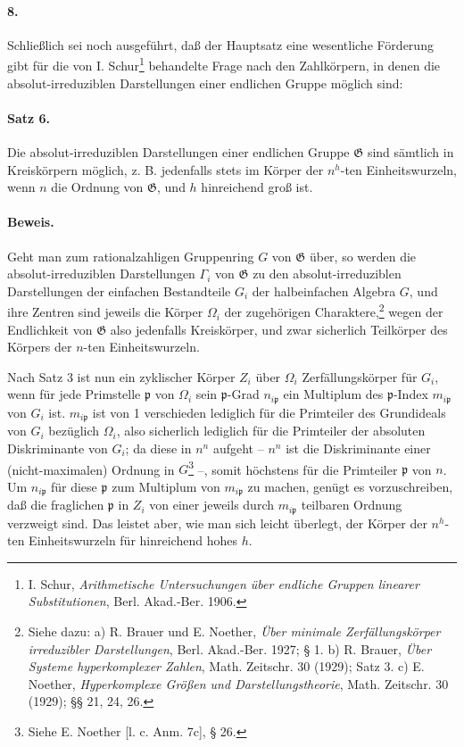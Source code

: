 \paragraph{8.}
Schließlich sei noch ausgeführt, daß der Hauptsatz eine wesentliche Förderung gibt für die von I. Schur\footnote{I. Schur, \emph{Arithmetische Untersuchungen über endliche Gruppen linearer Substitutionen}, Berl. Akad.-Ber. 1906.} behandelte Frage nach den Zahlkörpern, in denen die absolut-irreduziblen Darstellungen einer endlichen Gruppe möglich sind:

\paragraph{Satz 6.}
Die absolut-irreduziblen Darstellungen einer endlichen Gruppe \(\mathfrak G\) sind sämtlich in Kreiskörpern möglich, z. B. jedenfalls stets im Körper der \(n^h\)-ten Einheitswurzeln, wenn \(n\) die Ordnung von \(\mathfrak G\), und \(h\) hinreichend groß ist.

\paragraph{Beweis.}
Geht man zum rationalzahligen Gruppenring \(G\) von \(\mathfrak G\) über, so werden die absolut-irreduziblen Darstellungen \(\Gamma_i\) von \(\mathfrak G\) zu den absolut-irreduziblen Darstellungen der einfachen Bestandteile \(G_i\) der halbeinfachen Algebra \(G\), und ihre Zentren sind jeweils die Körper \(\Omega_i\) der zugehörigen Charaktere,\footnote{Siehe dazu: a) R. Brauer und E. Noether, \emph{Über minimale Zerfällungskörper irreduzibler Darstellungen}, Berl. Akad.-Ber. 1927; § 1. b) R. Brauer, \emph{Über Systeme hyperkomplexer Zahlen}, Math. Zeitschr. 30 (1929); Satz 3. c) E. Noether, \emph{Hyperkomplexe Größen und Darstellungstheorie}, Math. Zeitschr. 30 (1929); §§ 21, 24, 26.} wegen der Endlichkeit von \(\mathfrak G\) also jedenfalls Kreiskörper, und zwar sicherlich Teilkörper des Körpers der \(n\)-ten Einheitswurzeln.

Nach Satz 3 ist nun ein zyklischer Körper \(Z_i\) über \(\Omega_i\) Zerfällungskörper für \(G_i\), wenn für jede Primstelle \(\mathfrak p\) von \(\Omega_i\) sein \(\mathfrak p\)-Grad \(n_{i\mathfrak p}\) ein Multiplum des \(\mathfrak p\)-Index \(m_{i\mathfrak p}\) von \(G_i\) ist. \(m_{i\mathfrak p}\) ist von 1 verschieden lediglich für die Primteiler des Grundideals von \(G_i\) bezüglich \(\Omega_i\), also sicherlich lediglich für die Primteiler der absoluten Diskriminante von \(G_i\); da diese in \(n^n\) aufgeht -- \(n^n\) ist die Diskriminante einer (nicht-maximalen) Ordnung in \(G\)\footnote{Siehe E. Noether [l. c. Anm. 7c], § 26.} --, somit höchstens für die Primteiler \(\mathfrak p\) von \(n\). Um \(n_{i\mathfrak p}\) für diese \(\mathfrak p\) zum Multiplum von \(m_{i\mathfrak p}\) zu machen, genügt es vorzuschreiben, daß die fraglichen \(\mathfrak p\) in \(Z_i\) von einer jeweils durch \(m_{i\mathfrak p}\) teilbaren Ordnung verzweigt sind. Das leistet aber, wie man sich leicht überlegt, der Körper der \(n^h\)-ten Einheitswurzeln für hinreichend hohes \(h\).

